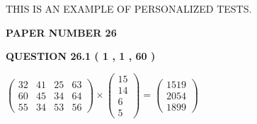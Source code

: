 \documentclass[12pt]{article}
\begin{document}
 
 
   
   
   
   
   
   
{\Huge  THIS IS AN EXAMPLE OF}
{\Huge  PERSONALIZED TESTS. }
   
   
   
   
\setcounter{page}{ 
    26001 } 
   
   
 {\textbf{ \Large{ PAPER NUMBER           26  }}}
   
   
   
   
  
  
{\textbf{\large{QUESTION
26.1 
 (           1 ,           1 ,          60 )
}}}

 
$\left( \begin{array}{ccccccccccccccc}
          32  & 
          41  & 
          25  & 
          63  \\ 
          60  & 
          45  & 
          34  & 
          64  \\ 
          55  & 
          34  & 
          53  & 
          56
\end{array}\right) \times
\left( \begin{array}{c}
          15  \\ 
          14  \\ 
           6  \\ 
           5
\end{array}\right)  =
\left( \begin{array}{c}
        1519  \\ 
        2054  \\ 
        1899
\end{array}\right)  $
 
\end{document}
